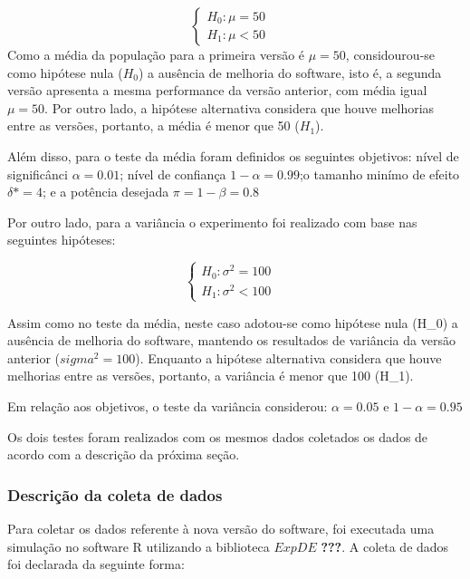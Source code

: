 \documentclass[]{article}
\begin{document}
\[\begin{cases} H_0: \mu = 50&\\H_1: \mu<50\end{cases}\] Como a média da
população para a primeira versão é \(\mu = 50\), considourou-se como
hipótese nula (\(H_0\)) a ausência de melhoria do software, isto é, a
segunda versão apresenta a mesma performance da versão anterior, com
média igual \(\mu = 50.\) Por outro lado, a hipótese alternativa
considera que houve melhorias entre as versões, portanto, a média é
menor que 50 (\(H_1\)).

Além disso, para o teste da média foram definidos os seguintes
objetivos: nível de significânci \(\alpha = 0.01\); nível de confiança
\(1 - \alpha = 0.99\);o tamanho minímo de efeito \(\delta* = 4\); e a
potência desejada \(\pi = 1 - \beta =0.8\)

Por outro lado, para a variância o experimento foi realizado com base
nas seguintes hipóteses:

\[\begin{cases} H_0: \sigma^{2} = 100&\\H_1: \sigma^{2} < 100\end{cases}\]

Assim como no teste da média, neste caso adotou-se como hipótese nula
(H\_0) a ausência de melhoria do software, mantendo os resultados de
variância da versão anterior (\(sigma^{2} = 100\)). Enquanto a hipótese
alternativa considera que houve melhorias entre as versões, portanto, a
variância é menor que 100 (H\_1).

Em relação aos objetivos, o teste da variância considerou:
\(\alpha = 0.05\) e \(1 - \alpha = 0.95\)

Os dois testes foram realizados com os mesmos dados coletados os dados
de acordo com a descrição da próxima seção.

\hypertarget{descricao-da-coleta-de-dados}{%
\subsubsection{Descrição da coleta de
dados}\label{descricao-da-coleta-de-dados}}

Para coletar os dados referente à nova versão do software, foi executada
uma simulação no software R utilizando a biblioteca \(ExpDE\)
{\textbf{???}}. A coleta de dados foi declarada da seguinte forma:
\end{document}
